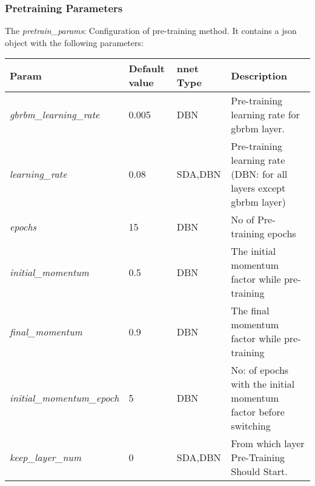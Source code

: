 \subsubsection{Pretraining Parameters}
\label{subsec:pretrainparam}
The \emph{pretrain\_params}: Configuration of pre-training method. It contains a json object with the following parameters:
\begin{table}[h]
\centering
\begin{tabular}{|l|l|l|p{6cm}|}
\hline
 Param	 & Default value	 & nnet Type	 & Description\\
\hline
 \emph{gbrbm\_learning\_rate}	 &     0.005	 &    DBN	 & Pre-training learning rate for gbrbm layer.\\
 \emph{learning\_rate}	 &      0.08	 &  SDA,DBN	 & Pre-training learning rate (DBN: for all layers except gbrbm layer)\\
 \emph{epochs}	 &       15	 &    DBN	 & No of Pre-training epochs\\
 \emph{initial\_momentum}	 &      0.5	 &    DBN	 & The initial momentum factor while pre-training\\
 \emph{final\_momentum}	 &      0.9	 &    DBN	 & The final momentum factor while pre-training\\
 \emph{initial\_momentum\_epoch}	 &       5	 &    DBN	 & No: of epochs with the initial momentum factor before switching\\
 \emph{keep\_layer\_num}	 &       0	 &  SDA,DBN	 & From which layer Pre-Training Should Start.\\
 \hline
\end{tabular}
\end{table}

